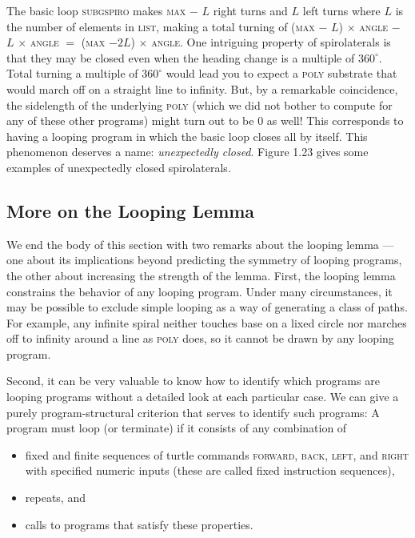 \documentclass{book}
\begin{document}
The basic loop \textsc{subgspiro} makes \textsc{max} $-$ $L$ right turns and $L$ left turns
where $L$ is the number of elements in \textsc{list}, making a total turning of
(\textsc{max} $-$ $L$) $\times$ \textsc{angle} $-$ $L$ $\times$ \textsc{angle} $=$ (\textsc{max} $- 2L$) $\times$ \textsc{angle}.
One intriguing property of spirolaterals is that they may be closed even
when the heading change is a multiple of $360^{\circ}$. Total turning a multiple
of $360^{\circ}$ would lead you to expect a \textsc{poly} substrate that would march
off on a straight line to infinity. But, by a remarkable coincidence, the
sidelength of the underlying \textsc{poly} (which we did not bother to compute
for any of these other programs) might turn out to be 0 as well! This
corresponds to having a looping program in which the basic loop closes
all by itself. This phenomenon deserves a name: {\em unexpectedly closed}. Figure 1.23 gives some examples of unexpectedly closed spirolaterals.

\subsection{More on the Looping Lemma}

We end the body of this section with two remarks about the looping
lemma --- one about its implications beyond predicting the symmetry of
looping programs, the other about increasing the strength of the lemma.
First, the looping lemma constrains the behavior of any looping program. Under many circumstances, it may be possible to exclude simple
looping as a way of generating a class of paths. For example, any infinite
spiral neither touches base on a lixed circle nor marches off to infinity
around a line as \textsc{poly} does, so it cannot be drawn by any looping program.

Second, it can be very valuable to know how to identify which programs are looping programs without a detailed look at each particular
case. We can give a purely program-structural criterion that serves to
identify such programs: A program must loop (or terminate) if it consists
of any combination of

\begin{itemize}
\item fixed and finite sequences of turtle commands \textsc{forward}, \textsc{back}, \textsc{left},
and \textsc{right} with specified numeric inputs (these are called fixed instruction sequences),
\item repeats, and
\item calls to programs that satisfy these properties.
\end{itemize}
\end{document}
